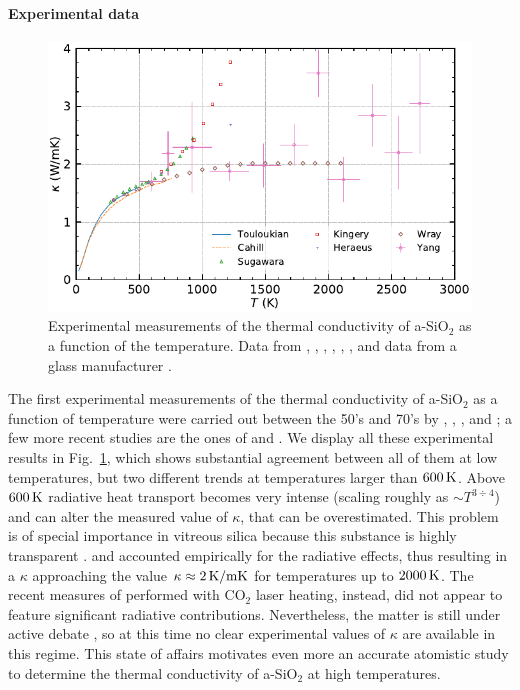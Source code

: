 \paragraph{Experimental data}
\begin{figure}
    \centering
    \includegraphics[width=\textwidth]{chapters/chapter6/figures/silica_expkappa.pdf}
    \caption{Experimental measurements of the thermal conductivity of a-SiO$_2$ as a function of the temperature. Data from \citet{Touloukian1970}, \citet{Cahill1990}, \citet{Sugawara1969}, \citet{Kingery1955}, \citet{Wray1959}, \citet{Yang2009}, and data from a glass manufacturer \cite{Heraeus2010}. 
    }
    \label{fig:silica-exp-kappa}
\end{figure}
The first experimental measurements of the thermal conductivity of a-SiO$_2$ as a function of temperature were carried out between the 50's and 70's by \citet{Kingery1955}, \citet{Wray1959}, \citet{Sugawara1969}, and \citet{Touloukian1970}; a few more recent studies are the ones of \citet{Cahill1990} and \citet{Yang2009}. 
We display all these experimental results in Fig.~\ref{fig:silica-exp-kappa}, which shows substantial agreement between all of them at low temperatures, but two different trends at temperatures larger than $600\,\mathrm{K}$. 
Above $600\,\mathrm{K}$ radiative heat transport becomes very intense (scaling roughly as $\sim T^{3\div 4}$) and can alter the measured value of $\kappa$, that can be overestimated. This problem is of special importance in vitreous silica because this substance is highly transparent \cite{Carwile1966, Cahill1990, Gardon1961}. \citet{Cahill1990} and \citet{Wray1959} accounted empirically for the radiative effects, thus resulting in a $\kappa$ approaching the value $\kappa\approx 2\,\mathrm{K/mK}$ for temperatures up to $2000\,\mathrm{K}$. The recent measures of \citet{Yang2009} performed with CO$_2$ laser heating, instead, did not appear to feature significant radiative contributions. 
Nevertheless, the matter is still under active debate \cite{Bouchut2004}, so at this time no clear experimental values of $\kappa$ are available in this regime. This state of affairs motivates even more an accurate atomistic study to determine the thermal conductivity of a-SiO$_2$ at high temperatures. 

